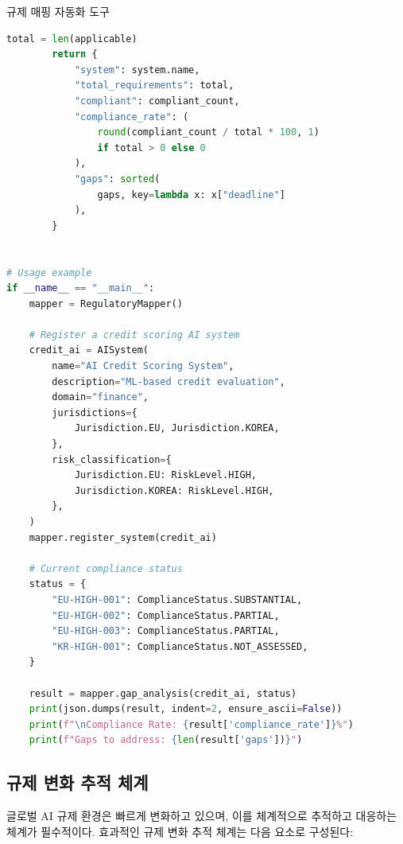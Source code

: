 \begin{practicaltool}{규제 매핑 자동화 도구}
\begin{lstlisting}[language=Python]
        total = len(applicable)
        return {
            "system": system.name,
            "total_requirements": total,
            "compliant": compliant_count,
            "compliance_rate": (
                round(compliant_count / total * 100, 1)
                if total > 0 else 0
            ),
            "gaps": sorted(
                gaps, key=lambda x: x["deadline"]
            ),
        }


# Usage example
if __name__ == "__main__":
    mapper = RegulatoryMapper()

    # Register a credit scoring AI system
    credit_ai = AISystem(
        name="AI Credit Scoring System",
        description="ML-based credit evaluation",
        domain="finance",
        jurisdictions={
            Jurisdiction.EU, Jurisdiction.KOREA,
        },
        risk_classification={
            Jurisdiction.EU: RiskLevel.HIGH,
            Jurisdiction.KOREA: RiskLevel.HIGH,
        },
    )
    mapper.register_system(credit_ai)

    # Current compliance status
    status = {
        "EU-HIGH-001": ComplianceStatus.SUBSTANTIAL,
        "EU-HIGH-002": ComplianceStatus.PARTIAL,
        "EU-HIGH-003": ComplianceStatus.PARTIAL,
        "KR-HIGH-001": ComplianceStatus.NOT_ASSESSED,
    }

    result = mapper.gap_analysis(credit_ai, status)
    print(json.dumps(result, indent=2, ensure_ascii=False))
    print(f"\nCompliance Rate: {result['compliance_rate']}%")
    print(f"Gaps to address: {len(result['gaps'])}")
\end{lstlisting}
\end{practicaltool}

\subsection{규제 변화 추적 체계}

글로벌 AI 규제 환경은 빠르게 변화하고 있으며, 이를 체계적으로 추적하고 대응하는 체계가 필수적이다. 효과적인 규제 변화 추적 체계는 다음 요소로 구성된다:

